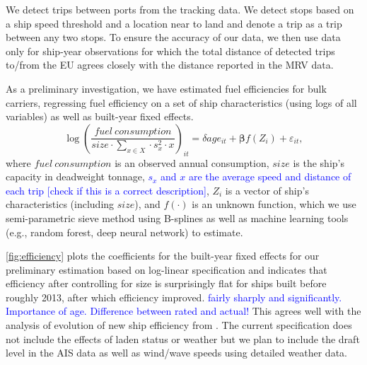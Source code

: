 \documentclass[hidelinks, 12pt,letterpaper]{article}
\begin{document}
We detect trips between ports from the tracking data. We detect stops based on a ship speed threshold and a location near to land and denote a trip  as a trip between any two stops. To ensure the accuracy of our data, we then use data only for ship-year observations for which the total distance of detected trips to/from the EU agrees closely with the distance reported in the MRV data. %

As a preliminary investigation, we have estimated fuel efficiencies for bulk carriers, regressing fuel efficiency on a set of ship characteristics (using logs of all variables) as well as built-year fixed effects.
 \begin{equation}\label{eq1}
 \log\left(
     \frac{fuel~consumption}{size \cdot \sum_{x \in X}  \cdot s_x^2 \cdot x}
 \right)_{it}
         = \delta age_{it} + \boldsymbol{\beta}f(Z_i) + \varepsilon_{it},
 \end{equation}
 where $fuel~consumption$ is an observed annual consumption, $size$ is the ship's capacity in deadweight tonnage,  \textcolor{blue}{$s_x$ and $x$ are the average speed and distance of each trip [check if this is a correct description]},  $Z_i$ is a vector of ship's characteristics (including $size$), and $f(\cdot)$ is an unknown function, which we use semi-parametric sieve method using B-splines as well as machine learning tools (e.g., random forest, deep neural network) to estimate.
 
\autoref{fig:efficiency} plots the coefficients for the built-year fixed effects for our preliminary estimation based on log-linear specification and indicates that efficiency after controlling for size is surprisingly flat for ships built before roughly 2013, after which efficiency improved. \textcolor{blue}{fairly sharply and significantly. Importance of age. Difference between rated and actual!} This agrees well with the analysis of evolution of new ship efficiency from \citet[][Figure 15]{faber2015historical}. The current specification does not include the effects of laden status or weather but we plan to include  the draft level in the AIS data as well as wind/wave speeds using detailed weather data. %
\end{document}
